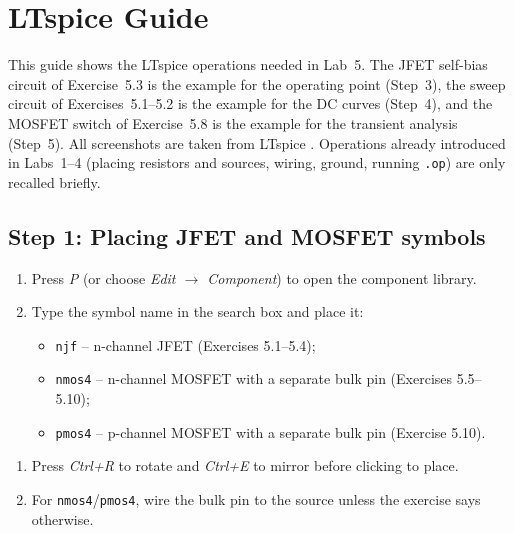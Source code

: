 \section{LTspice Guide}

This guide shows the LTspice operations needed in Lab~5. The JFET self-bias circuit of Exercise~5.3 is the example for the
operating point (Step~3), the sweep circuit of Exercises~5.1--5.2 is the example for the DC curves (Step~4), and the MOSFET
switch of Exercise~5.8 is the example for the transient analysis (Step~5). All screenshots are taken from LTspice \ltspiceVersion. Operations already introduced in Labs~1--4
(placing resistors and sources, wiring, ground, running \texttt{.op}) are only recalled briefly.

\subsection{Step 1: Placing JFET and MOSFET symbols}
\begin{enumerate}[itemsep=2pt]
  \item Press \textit{P} (or choose \textit{Edit $\rightarrow$ Component}) to open the component library.
  \item Type the symbol name in the search box and place it:
        \begin{itemize}[itemsep=1pt]
          \item \texttt{njf} -- n-channel JFET (Exercises 5.1--5.4);
          \item \texttt{nmos4} -- n-channel MOSFET with a separate bulk pin (Exercises 5.5--5.10);
          \item \texttt{pmos4} -- p-channel MOSFET with a separate bulk pin (Exercise 5.10).
        \end{itemize}
\end{enumerate}
\begin{enumerate}[resume,itemsep=2pt]
  \item Press \textit{Ctrl+R} to rotate and \textit{Ctrl+E} to mirror before clicking to place.
  \item For \texttt{nmos4}/\texttt{pmos4}, wire the bulk pin to the source unless the exercise says otherwise.
\end{enumerate}

